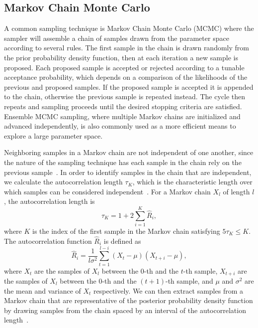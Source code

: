 \subsection{Markov Chain Monte Carlo}
A common sampling technique is Markov Chain Monte Carlo (MCMC) where the sampler will assemble a chain of samples drawn from the parameter space according to several rules. The first sample in the chain is drawn randomly from the prior probability density function, then at each iteration a new sample is proposed. Each proposed sample is accepted or rejected according to a tunable acceptance probability, which depends on a comparison of the likelihoods of the previous and proposed samples. If the proposed sample is accepted it is appended to the chain, otherwise the previous sample is repeated instead. The cycle then repeats and sampling proceeds until the desired stopping criteria are satisfied. Ensemble MCMC sampling, where multiple Markov chains are initialized and advanced independently, is also commonly used as a more efficient means to explore a large parameter space.

Neighboring samples in a Markov chain are not independent of one another, since the nature of the sampling technique has each sample in the chain rely on the previous sample~\cite{Christensen:2004jm}. In order to identify samples in the chain that are independent, we calculate the autocorrelation length $\tau_K$, which is the characteristic length over which samples can be considered independent~\cite{Madras:1988ei}. For a Markov chain $X_l$ of length $l$, the autocorrelation length is
\begin{equation}\label{eqn:acl}
\tau_K = 1 + 2\sum_{i=1}^{K}\hat{R}_{i} ,
\end{equation}
where $K$ is the index of the first sample in the Markov chain satisfying $5\tau_K \leq K$. The autocorrelation function $\hat{R}_{i}$ is defined as
\begin{equation}\label{eqn:acf}
\hat{R}_{i} = \frac{1}{l \sigma^{2}} \sum_{t=1}^{l-i} \left( X_{t} - \mu \right) \left( X_{t+i} - \mu \right),
\end{equation}
where $X_t$ are the samples of $X_{l}$ between the 0-th and the $t$-th sample, $X_{t+i}$ are the samples of $X_{l}$ between the 0-th and the $(t+1)$-th sample, and $\mu$ and $\sigma^2$ are the mean and variance of $X_t$ respectively. We can then extract samples from a Markov chain that are representative of the posterior probability density function by drawing samples from the chain spaced by an interval of the autocorrelation length~\cite{Christensen:2004jm}.


